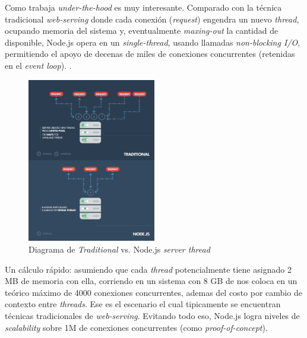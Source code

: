 Como trabaja \textit{under-the-hood} es muy interesante. Comparado con la técnica tradicional \textit{web-serving} donde cada conexión (\textit{request}) engendra un nuevo \textit{thread}, ocupando memoria  del sistema y, eventualmente \textit{maxing-out} la cantidad de  disponible, Node.js opera en un \textit{single-thread}, usando llamadas \textit{non-blocking I/O}, permitiendo el apoyo de decenas de miles de conexiones concurrentes (retenidas en el \textit{event loop}). .


\begin{figure}[h!]
	\centering
	\includegraphics[width=0.5\textwidth]{figuras/cap2/diagram_traditional_vs_node_serverthread.png}
	\caption{Diagrama de \textit{Traditional} vs. Node.js \textit{server thread}}
	\label{figure:diagram_traditional_vs_nodejs_server_thread}
\end{figure}



Un cálculo rápido: asumiendo que cada \textit{thread} potencialmente tiene asignado 2 MB de memoria con ella, corriendo en un sistema con 8 GB de  nos coloca en un teórico máximo de 4000 conexiones concurrentes, ademas del costo por cambio de contexto entre \textit{threads}. Ese es el escenario el cual tipicamente se encuentran técnicas tradicionales de \textit{web-serving}. Evitando todo eso, Node.js logra niveles de \textit{scalability} sobre 1M de conexiones concurrentes (como \textit{proof-of-concept}).

